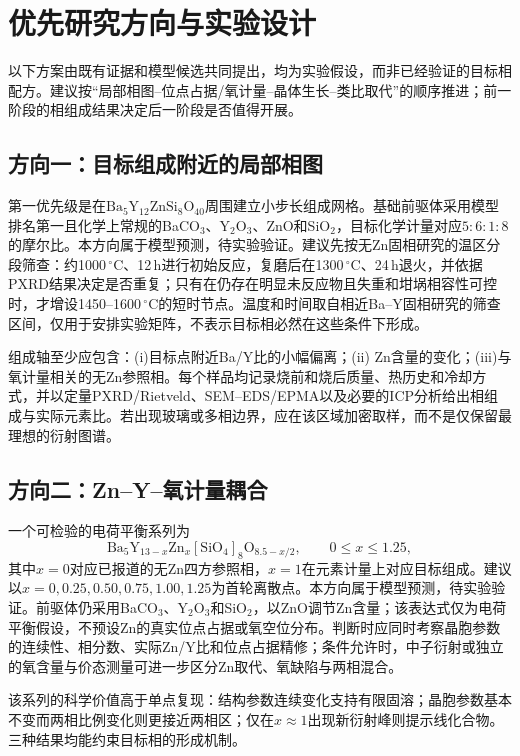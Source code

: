 \section{优先研究方向与实验设计}
\label{sec:future-directions}

以下方案由既有证据和模型候选共同提出，均为实验假设，而非已经验证的目标相配方。建议按“局部相图--位点占据/氧计量--晶体生长--类比取代”的顺序推进；前一阶段的相组成结果决定后一阶段是否值得开展。

\subsection{方向一：目标组成附近的局部相图}

第一优先级是在$\mathrm{Ba_5Y_{12}ZnSi_8O_{40}}$周围建立小步长组成网格。基础前驱体采用模型排名第一且化学上常规的BaCO$_3$、Y$_2$O$_3$、ZnO和SiO$_2$，目标化学计量对应$5{:}6{:}1{:}8$的摩尔比。本方向属于模型预测，待实验验证。建议先按无Zn固相研究的温区分段筛查：约1000\,$^\circ$C、12\,h进行初始反应，复磨后在1300\,$^\circ$C、24\,h退火，并依据PXRD结果决定是否重复；只有在仍存在明显未反应物且失重和坩埚相容性可控时，才增设1450--1600\,$^\circ$C的短时节点。温度和时间取自相近Ba--Y固相研究的筛查区间\cite{yamane2024microstructure,gulay2024navigation}，仅用于安排实验矩阵，不表示目标相必然在这些条件下形成。

组成轴至少应包含：(i)目标点附近Ba\slash Y比的小幅偏离；(ii) Zn含量的变化；(iii)与氧计量相关的无Zn参照相。每个样品均记录烧前和烧后质量、热历史和冷却方式，并以定量PXRD\slash Rietveld、SEM--EDS\slash EPMA以及必要的ICP分析给出相组成与实际元素比。若出现玻璃或多相边界，应在该区域加密取样，而不是仅保留最理想的衍射图谱。

\subsection{方向二：Zn--Y--氧计量耦合}

一个可检验的电荷平衡系列为
\[
\mathrm{Ba_5Y_{13-\mathit{x}}Zn_{\mathit{x}}[SiO_4]_8O_{8.5-\mathit{x}/2}},
\qquad 0\leq x\leq1.25,
\]
其中$x=0$对应已报道的无Zn四方参照相，$x=1$在元素计量上对应目标组成。建议以$x=0,0.25,0.50,0.75,1.00,1.25$为首轮离散点。本方向属于模型预测，待实验验证。前驱体仍采用BaCO$_3$、Y$_2$O$_3$和SiO$_2$，以ZnO调节Zn含量；该表达式仅为电荷平衡假设，不预设Zn的真实位点占据或氧空位分布。判断时应同时考察晶胞参数的连续性、相分数、实际Zn\slash Y比和位点占据精修；条件允许时，中子衍射或独立的氧含量与价态测量可进一步区分Zn取代、氧缺陷与两相混合。

该系列的科学价值高于单点复现：结构参数连续变化支持有限固溶；晶胞参数基本不变而两相比例变化则更接近两相区；仅在$x\approx1$出现新衍射峰则提示线化合物。三种结果均能约束目标相的形成机制。

